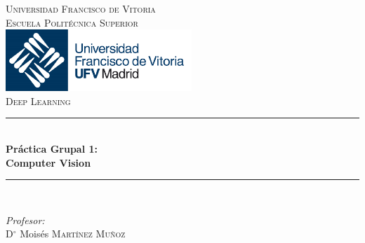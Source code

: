 \documentclass{article}
\begin{document}
\begin{titlepage}

\newcommand{\HRule}{\rule{\linewidth}{0.5mm}} 

\center 
 

\textsc{\LARGE Universidad Francisco de Vitoria}\\[1.5cm] 
\textsc{\LARGE Escuela Politécnica Superior}\\[1.5cm] 

\includegraphics[width=7cm]{imagenes/logo_ufv.png}\\[1cm] 
\textsc{\Large Deep Learning}\\[1cm]



\HRule \\[0.4cm]
{ \huge \bfseries Práctica Grupal 1: \\
Computer Vision}\\[0.4cm] %
\HRule \\[1.5cm]
 

\begin{minipage}{0.5\textwidth}
    \begin{flushleft} \large
        \emph{Profesor:}\\
            D$^\circ$ Moisés \textsc{Martínez Muñoz}\\ 
    \end{flushleft}
        

\end{minipage}
\end{titlepage}
\end{document}
